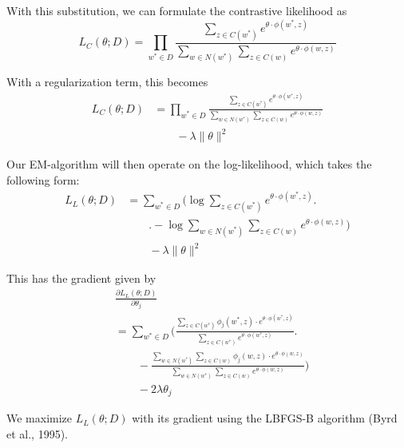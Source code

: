 \documentclass[11pt,twocolumn]{article}
\begin{document}
With this substitution, we can formulate the contrastive likelihood as
\begin{equation}
    L_C(\theta; D) = \prod_{w^*\in D} \frac{\sum_{z\in C(w^*)} e^{\theta\cdot\phi(w^*,z)}} {\sum_{w\in N(w^*)} \sum_{z\in C(w)} e^{\theta\cdot\phi(w,z)}}
\end{equation}

With a regularization term, this becomes
\begin{equation}
    \begin{split}
        L_C(\theta; D) &= \prod_{w^*\in D} \frac{\sum_{z\in C(w^*)} e^{\theta\cdot\phi(w^*,z)}} {\sum_{w\in N(w^*)} \sum_{z\in C(w)} e^{\theta\cdot\phi(w,z)}} \\
        &\qquad - \lambda \|\theta\|^2
    \end{split}
\end{equation}

Our EM-algorithm will then operate on the log-likelihood, which takes the following form:
\begin{equation}
    \begin{split}
        L_L(\theta; D) &= \sum_{w^*\in D} \Bigg(\log \sum_{z\in C(w^*)} e^{\theta\cdot\phi(w^*,z)} \Bigg.\\
        &\qquad\Bigg. -\log \sum_{w\in N(w^*)} \sum_{z\in C(w)} e^{\theta\cdot\phi(w,z)} \Bigg) \\
        &\qquad - \lambda \|\theta\|^2
    \end{split}
\end{equation}

This has the gradient given by
\begin{equation}
    \begin{split}
        &\frac{\partial L_L(\theta; D)}{\partial \theta_j} \\
        &= \sum_{w^*\in D} \Bigg( \frac{\sum_{z\in C(w^*)} \phi_j(w^*,z)\cdot e^{\theta\cdot\phi(w^*,z)}} {\sum_{z\in C(w^*)} e^{\theta\cdot\phi(w^*,z)}} \Bigg. \\
        &\qquad -\frac{\sum_{w\in N(w^*)} \sum_{z\in C(w)} \phi_j(w,z)\cdot e^{\theta\cdot\phi(w,z)}} {\sum_{w\in N(w^*)} \sum_{z\in C(w)} e^{\theta\cdot\phi(w,z)}} \Bigg) \\
        &\qquad -2\lambda\theta_j
    \end{split}
\end{equation}

We maximize $L_L(\theta; D)$ with its gradient using the LBFGS-B algorithm (Byrd et al., 1995).
\end{document}
